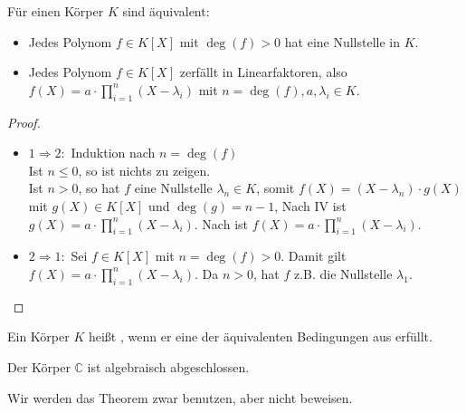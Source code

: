 \begin{proposition}
	Für einen Körper $K$ sind äquivalent:
	\begin{itemize}
		\item Jedes Polynom $f \in K[X]$ mit $\deg(f)>0$ hat eine Nullstelle in $K$.
		\item Jedes Polynom $f \in K[X]$ zerfällt in Linearfaktoren, also $f(X)=a\cdot \prod _{i=1}^n 
		(X-\lambda_i)$ mit $n=\deg(f), a, \lambda_i \in K$.
	\end{itemize}
\end{proposition}
\begin{proof}
	\begin{itemize}
		\item $1 \Rightarrow 2:$ Induktion nach $n=\deg(f)$ \\
		Ist $n\le0$, so ist nichts zu zeigen. \\
		Ist $n>0$, so hat $f$ eine Nullstelle $\lambda_n \in K$, somit $f(X)=(X-\lambda_n)\cdot g(X)$ mit $g(X) \in K[X]$
		und $\deg(g)=n-1$, Nach IV ist $g(X)=a\cdot \prod _{i=1}^n (X-\lambda_i)$. Nach  ist $f(X)=a\cdot \prod 
		_{i=1}^n (X-\lambda_i)$.
		\item $2 \Rightarrow 1:$ Sei $f \in K[X]$ mit $n=\deg(f)>0$. Damit gilt $f(X)=a\cdot \prod _{i=1}^n (X-\lambda_i)$.
		Da $n>0$, hat $f$ z.B. die Nullstelle $\lambda_1$.
	\end{itemize}
\end{proof}

\begin{definition}
	Ein Körper $K$ heißt , wenn er eine 
	der äquivalenten Bedingungen aus  erfüllt. 
\end{definition}

\begin{theorem}
	Der Körper $\mathbb C$ ist algebraisch abgeschlossen.
\end{theorem}

\begin{remark}
	Wir werden das Theorem zwar benutzen, aber nicht beweisen.
\end{remark}